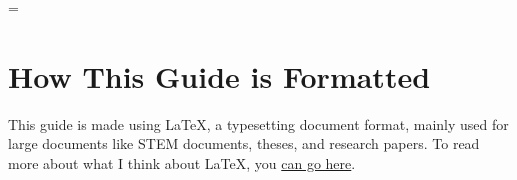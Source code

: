 \emergencystretch=\maxdimen
{}

\maketitle              %

\section{How This Guide is Formatted}
This guide is made using \LaTeX{}, a typesetting document format, mainly used
for large documents like STEM documents, theses, and research papers. To read
more about what I think about \LaTeX{}, you
\href{https://husseinesmail.xyz/articles/is-latex-better.html}{can go here}.

